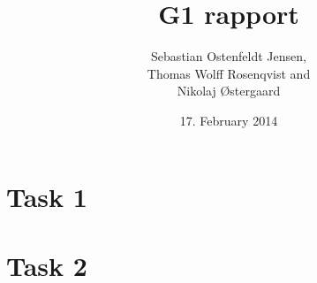 \documentclass[11pt]{article}
\begin{document}
\title{G1 rapport}
\author{Sebastian Ostenfeldt Jensen,\\ Thomas Wolff Rosenqvist and\\ Nikolaj Østergaard}
\date{17. February 2014}
\maketitle
\thispagestyle{empty}
\pagebreak
{}
\setcounter{page}{1}

\section{Task 1}

\section{Task 2}
\end{document}
